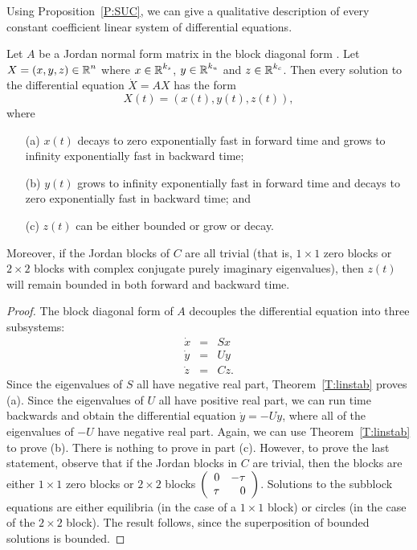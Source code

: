\documentclass{ximera}
\begin{document}
Using Proposition~\ref{P:SUC}, we can give a qualitative description of 
every constant coefficient linear system of differential equations.
\begin{thm}  \label{T:SUC}
Let $A$ be a Jordan normal form matrix in the block diagonal form .
Let $X=(x,y,z)\in\mbox{$\Bbb{R}$}^n$ where $x\in\mbox{$\Bbb{R}$}^{k_s}$, $y\in\mbox{$\Bbb{R}$}^{k_u}$ and $z\in\mbox{$\Bbb{R}$}^{k_c}$.
Then every solution to the differential equation $\dot{X}=AX$ has the form
\[
X(t) = (x(t), y(t),z(t)),
\]
where
\begin{itemize}
\item[(a)]  $x(t)$ decays to zero exponentially fast in 
	forward time and grows to 
	infinity exponentially fast in backward time;
\item[(b)]  $y(t)$ grows to infinity exponentially fast in forward time and 
	decays to zero exponentially fast in backward time; and
\item[(c)]  $z(t)$ can be either bounded or grow or decay. 
\end{itemize}
Moreover, if the Jordan blocks of $C$ are all trivial
(that is, $1\times 1$ zero blocks or $2\times 2$ blocks with complex
conjugate purely imaginary eigenvalues), then $z(t)$ will remain bounded in 
both forward and backward time. 
\end{thm}

\begin{proof}  The block diagonal form of $A$ decouples the differential equation 
into three subsystems:
\begin{eqnarray*}
\dot{x} & = & Sx \\
\dot{y} & = & Uy \\
\dot{z} & = & Cz.
\end{eqnarray*}  
Since the eigenvalues of $S$ all have negative real part, Theorem~\ref{T:linstab} proves (a).  Since the eigenvalues of $U$ all have 
positive real part, we can run time backwards and obtain the differential 
equation $\dot{y}=-Uy$, where all of the eigenvalues of $-U$ have negative 
real part.  Again, we can use Theorem~\ref{T:linstab} to prove (b).  There 
is nothing to prove in part (c).  However, to prove the last statement, observe
that if the Jordan blocks in $C$ are trivial, then the blocks are either
$1\times 1$ zero blocks or $2\times 2$ blocks $\left(\begin{array}{rr} 0 & -\tau\\ \tau &0\end{array}\right)$.
Solutions to the subblock equations are either equilibria (in the case of a
$1\times 1$ block) or circles (in the case of the $2\times 2$ block).  The
result follows, since the superposition of bounded solutions is bounded. \end{proof}
\end{document}
